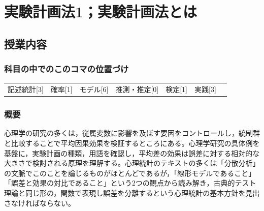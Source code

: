\section{実験計画法1；実験計画法とは}
\label{s12_design1}

\subsection{授業内容}
\subsubsection{科目の中でのこのコマの位置づけ}
\begin{tabular}[t]{ccccccc}
	記述統計[3] & 確率[1] & モデル[6] & 推測・推定[0] & 検定[1] & 実践[3]
\end{tabular}
\subsubsection{概要}
心理学の研究の多くは，従属変数に影響を及ぼす要因をコントロールし，統制群と比較することで平均因果効果を検証するところにある。心理学研究の具体例を基盤に，実験計画の種類，用語を確認し，平均差の効果は誤差に対する相対的な大きさで検討される原理を理解する。心理統計のテキストの多くは「分散分析」の文脈でこのことを論じるものがほとんどであるが，「線形モデルであること」「誤差と効果の対比であること」という2つの観点から読み解き，古典的テスト理論と同じ形の，関数で表現し誤差を分離するという心理統計の基本方針を見出さなければならない。
